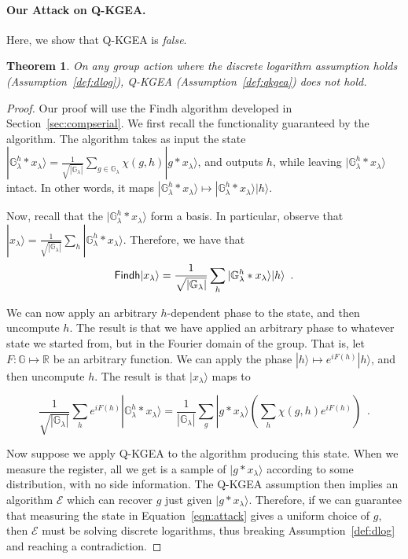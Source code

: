 \documentclass{article}\usepackage[a4paper,margin=20mm]{geometry}
\newtheorem{theorem}{Theorem}\newtheorem{lemma}[theorem]{Lemma}\newtheorem{proposition}[theorem]{Proposition}\newtheorem{corollary}[theorem]{Corollary}\newtheorem{definition}[theorem]{Definition}\newtheorem{claim}[theorem]{Claim}\newtheorem{remark}[theorem]{Remark}\newtheorem{observation}[theorem]{Observation}\newtheorem{conjecture}[theorem]{Conjecture}\newtheorem{example}[theorem]{Example}
\numberwithin{theorem}{section}
\numberwithin{equation}{section}
\newcommand{\R}{\mathbb{R}}
\newcommand{\G}{\mathbb{G}}
\newcommand{\Es}{{\mathcal{E}}}
\begin{document}
\paragraph{Our Attack on Q-KGEA.}\label{sec:KGEAattack} Here, we show that Q-KGEA is \emph{false}. 

\begin{theorem}\label{thm:kgeaattack} On any group action where the discrete logarithm assumption holds (Assumption~\ref{def:dlog}), Q-KGEA (Assumption~\ref{def:qkgea}) does not hold.
\end{theorem}
\begin{proof}Our proof will use the {\sf Findh} algorithm developed in Section~\ref{sec:compserial}. We first recall the functionality guaranteed by the algorithm. The algorithm takes as input the state $|\G_\lambda^h*x_\lambda\rangle=\frac{1}{\sqrt{|\G_\lambda|}}\sum_{g\in\G_\lambda}\chi(g,h)|g*x_\lambda\rangle$, and outputs $h$, while leaving $|\G_\lambda^h*x_\lambda\rangle$ intact. In other words, it maps $|\G_\lambda^h*x_\lambda\rangle\mapsto |\G_\lambda^h*x_\lambda\rangle|h\rangle$.
	
	Now, recall that the $|\G_\lambda^h*x_\lambda\rangle$ form a basis. In particular, observe that $|x_\lambda\rangle=\frac{1}{\sqrt{|\G_\lambda|}}\sum_h|\G_\lambda^h*x_\lambda\rangle$. Therefore, we have that
	\[{\sf Findh}|x_\lambda\rangle=\frac{1}{\sqrt{|\G_\lambda|}}\sum_h|\G_\lambda^h*x_\lambda\rangle|h\rangle\enspace .\]
	
	We can now apply an arbitrary $h$-dependent phase to the state, and then uncompute $h$. The result is that we have applied an arbitrary phase to whatever state we started from, but in the Fourier domain of the group. That is, let $F:\G\mapsto\R$ be an arbitrary function. We can apply the phase $|h\rangle\mapsto e^{iF(h)}|h\rangle$, and then uncompute $h$. The result is that $|x_\lambda\rangle$ maps to
	
	\begin{equation}\label{eqn:attack}\frac{1}{\sqrt{|\G_\lambda|}}\sum_h e^{iF(h)}|\G_\lambda^h*x_\lambda\rangle=\frac{1}{|\G_\lambda|}\sum_{g}|g*x_\lambda\rangle\left(\sum_h\chi(g,h)e^{iF(h)}\right)\enspace .\end{equation}
	
	Now suppose we apply Q-KGEA to the algorithm producing this state. When we measure the register, all we get is a sample of $|g*x_\lambda\rangle$ according to some distribution, with no side information. The Q-KGEA assumption then implies an algorithm $\Es$ which can recover $g$ just given $|g*x_\lambda\rangle$. Therefore, if we can guarantee that measuring the state in Equation~\ref{eqn:attack} gives a uniform choice of $g$, then $\Es$ must be solving discrete logarithms, thus breaking Assumption~\ref{def:dlog} and reaching a contradiction.
	

\end{proof}
\end{document}
